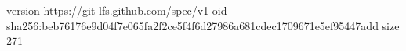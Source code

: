 version https://git-lfs.github.com/spec/v1
oid sha256:beb76176e9d04f7e065fa2f2ce5f4f6d27986a681cdec1709671e5ef95447add
size 271

